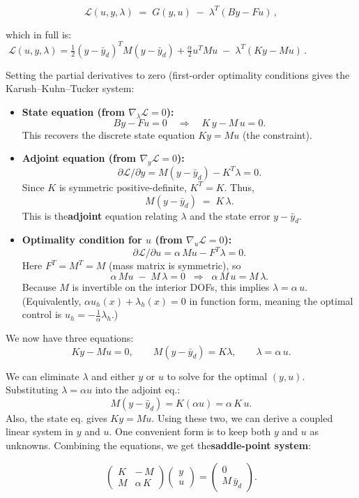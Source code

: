 \documentclass[a4paper,10pt]{article}
\begin{document}
\[
	\mathcal{L}(u,y,\lambda) \;=\; G(y,u)\;-\;\lambda^T(B y - F u)\,,
\]

which in full is: \(\; \mathcal{L}(u,y,\lambda) = \frac{1}{2}(y-\bar y_d)^T M (y-\bar y_d) + \frac{\alpha}{2} u^T M u \;-\;\lambda^T(Ky - M u)\,. \)

Setting the partial derivatives to zero (first-order optimality conditions gives the Karush–Kuhn–Tucker system:

\begin{itemize}
	\item \textbf{State equation (from \(\nabla_\lambda \mathcal{L}=0\)):}
	      \[By - Fu = 0 \quad\Longrightarrow\quad K\,y - M\,u = 0.\]
	      This recovers the discrete state equation \(K y = M u\) (the constraint).
	\item \textbf{Adjoint equation (from \(\nabla_y \mathcal{L}=0\)):}
	      \[\partial \mathcal{L}/\partial y = M(y - \bar y_d) - K^T \lambda = 0.\]
	      Since \(K\) is symmetric positive-definite, \(K^T=K\). Thus,
	      \[M(y - \bar y_d) \;=\; K\,\lambda.\]
	      This is the\textbf{adjoint} equation relating \(\lambda\) and the state error \(y-\bar y_d\).

	\item \textbf{Optimality condition for \(u\) (from \(\nabla_u \mathcal{L}=0\)):}
	      \[\partial \mathcal{L}/\partial u = \alpha\, M u - F^T \lambda = 0.\]
	      Here \(F^T=M^T=M\) (mass matrix is symmetric), so
	      \[\alpha\, M u \;-\; M\,\lambda = 0 \;\;\Longrightarrow\;\; \alpha\,M\,u = M\,\lambda.\]
	      Because \(M\) is invertible on the interior DOFs, this implies \(\lambda = \alpha\,u\).  (Equivalently, \(\alpha u_h(x) + \lambda_h(x) = 0\) in function form, meaning the optimal control is \(u_h=-\frac{1}{\alpha}\lambda_h\).)
\end{itemize}

We now have three equations:
\[
	K y - M u = 0, \qquad M(y - \bar y_d) = K\lambda, \qquad \lambda = \alpha\,u.
\]

We can eliminate \(\lambda\) and either \(y\) or \(u\) to solve for the optimal \((y,u)\). Substituting \(\lambda=\alpha u\) into the adjoint eq.:
\[M(y - \bar y_d) = K(\alpha u) = \alpha\,K\,u.\]
Also, the state eq. gives \(K y = M u\). Using these two, we can derive a coupled linear system in \(y\) and \(u\). One convenient form is to keep both \(y\) and \(u\) as unknowns. Combining the equations, we get the\textbf{saddle-point system}:

\[
	\begin{pmatrix} K & -\,M      \\[6pt]
                M & \alpha\,K\end{pmatrix}
	\begin{pmatrix}
		y \\[3pt] u
	\end{pmatrix} =
	\begin{pmatrix}
		0 \\[3pt]
		M\,\bar y_d
	\end{pmatrix}.
\]
\end{document}
